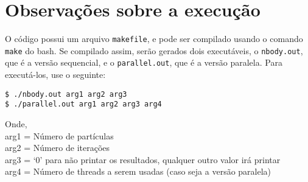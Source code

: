 \documentclass[a4paper, 12pt]{article}
\begin{document}

\section{Observações sobre a execução}

O código possui um arquivo \verb|makefile|, e pode ser compilado usando o
comando \verb|make| do bash. Se compilado assim, serão gerados dois executáveis,
o \verb|nbody.out|, que é a versão sequencial, e o \verb|parallel.out|, que é a
versão paralela. Para executá-los, use o seguinte:
\begin{verbatim}
$ ./nbody.out arg1 arg2 arg3
$ ./parallel.out arg1 arg2 arg3 arg4
\end{verbatim}
Onde,\\
arg1 = Número de partículas\\
arg2 = Número de iterações\\
arg3 = `0' para não printar os resultados, qualquer outro valor irá printar\\
arg4 = Número de threads a serem usadas (caso seja a versão paralela)

\end{document}
